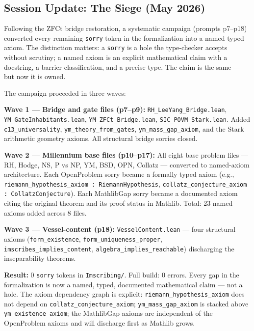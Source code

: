 \documentclass[12pt,a4paper]{article}
\begin{document}
\subsection{Session Update: The Siege (May 2026)}

Following the ZFCt bridge restoration, a systematic campaign (prompts p7--p18) converted every remaining \texttt{sorry} token in the formalization into a named typed axiom. The distinction matters: a \texttt{sorry} is a hole the type-checker accepts without scrutiny; a named axiom is an explicit mathematical claim with a docstring, a barrier classification, and a precise type. The claim is the same --- but now it is owned.

The campaign proceeded in three waves:

\textbf{Wave 1 --- Bridge and gate files (p7--p9):}
\texttt{RH\_LeeYang\_Bridge.lean}, \texttt{YM\_GateInhabitants.lean}, \texttt{YM\_ZFCt\_Bridge.lean}, \texttt{SIC\_POVM\_Stark.lean}. Added \texttt{c13\_universality}, \texttt{ym\_theory\_from\_gates}, \texttt{ym\_mass\_gap\_axiom}, and the Stark arithmetic geometry axioms. All structural bridge sorries closed.

\textbf{Wave 2 --- Millennium base files (p10--p17):}
All eight base problem files --- RH, Hodge, NS, P vs NP, YM, BSD, OPN, Collatz --- converted to named-axiom architecture. Each OpenProblem sorry became a formally typed axiom (e.g., \texttt{riemann\_hypothesis\_axiom : RiemannHypothesis}, \texttt{collatz\_conjecture\_axiom : CollatzConjecture}). Each MathlibGap sorry became a documented axiom citing the original theorem and its proof status in Mathlib. Total: 23 named axioms added across 8 files.

\textbf{Wave 3 --- Vessel-content (p18):}
\texttt{VesselContent.lean} --- four structural axioms (\texttt{form\_existence}, \texttt{form\_uniqueness\_proper}, \texttt{imscribes\_implies\_content}, \texttt{algebra\_implies\_reachable}) discharging the inseparability theorems.

\textbf{Result:} 0 \texttt{sorry} tokens in \texttt{Imscribing/}. Full build: 0 errors. Every gap in the formalization is now a named, typed, documented mathematical claim --- not a hole. The axiom dependency graph is explicit: \texttt{riemann\_hypothesis\_axiom} does not depend on \texttt{collatz\_conjecture\_axiom}; \texttt{ym\_mass\_gap\_axiom} is stacked above \texttt{ym\_existence\_axiom}; the MathlibGap axioms are independent of the OpenProblem axioms and will discharge first as Mathlib grows.
\end{document}
